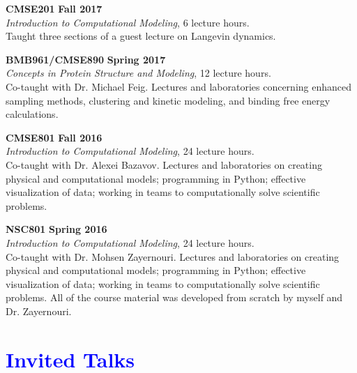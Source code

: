 \documentclass[margin,line]{res}
\begin{document}
\begin{resume}
{\bf CMSE201} \hfill {\bf Fall 2017} \\
\emph{Introduction to Computational Modeling}, 6 lecture hours.\\
Taught three sections of a guest lecture on Langevin dynamics.

{\bf BMB961/CMSE890} \hfill {\bf Spring 2017} \\
\emph{Concepts in Protein Structure and Modeling}, 12 lecture hours.\\
Co-taught with Dr. Michael Feig.
Lectures and laboratories concerning enhanced sampling methods, clustering and kinetic modeling, and binding free energy calculations.

{\bf CMSE801} \hfill {\bf Fall 2016} \\
\emph{Introduction to Computational Modeling}, 24 lecture hours.\\
Co-taught with Dr. Alexei Bazavov.
Lectures and laboratories on creating physical and computational models; programming in Python; effective visualization of data; working in teams to computationally solve scientific problems.

{\bf NSC801} \hfill {\bf Spring 2016} \\
\emph{Introduction to Computational Modeling}, 24 lecture hours.\\
Co-taught with Dr. Mohsen Zayernouri.
Lectures and laboratories on creating physical and computational models; programming in Python; effective visualization of data; working in teams to computationally solve scientific problems.
All of the course material was developed from scratch by myself and Dr. Zayernouri.

\section{\sc \textcolor{blue}{ Invited Talks }}


\end{resume}
\end{document}

